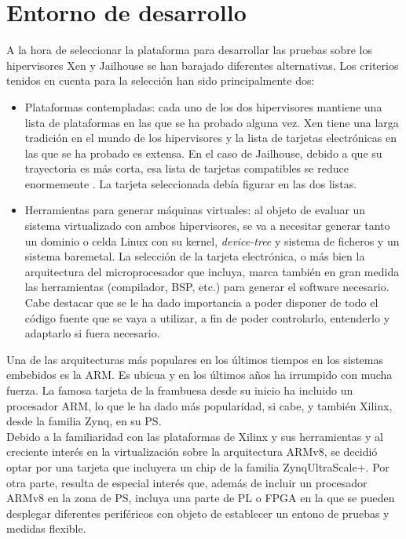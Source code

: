 \chapter{Entorno de desarrollo}

A la hora de seleccionar la plataforma para desarrollar las pruebas sobre los hipervisores Xen y Jailhouse se han barajado diferentes alternativas. Los criterios tenidos en cuenta para la selección han sido principalmente dos:
\begin{itemize}
  \item Plataformas contempladas: cada uno de los dos hipervisores mantiene una lista de plataformas en las que se ha probado alguna vez. Xen tiene una larga tradición en el mundo de los hipervisores y la lista de tarjetas electrónicas en las que se ha probado es extensa. En el caso de Jailhouse, debido a que su trayectoria es más corta, esa lista de tarjetas compatibles se reduce enormemente \cite{jailhouse_github}. La tarjeta seleccionada debía figurar en las dos listas.
  \item Herramientas para generar máquinas virtuales: al objeto de evaluar un sistema virtualizado con ambos hipervisores, se va a necesitar generar tanto un dominio o celda Linux con su kernel, \textit{device-tree} y sistema de ficheros y un sistema baremetal. La selección de la tarjeta electrónica, o más bien la arquitectura del microprocesador que incluya, marca también en gran medida las herramientas (compilador, BSP, etc.) para generar el software necesario. Cabe destacar que se le ha dado importancia a poder disponer de todo el código fuente que se vaya a utilizar, a fin de poder controlarlo, entenderlo y adaptarlo si fuera necesario.
\end{itemize}

Una de las arquitecturas más populares en los últimos tiempos en los sistemas embebidos es la ARM. Es ubicua y en los últimos años ha irrumpido con mucha fuerza. La famosa tarjeta de la frambuesa desde su inicio ha incluido un procesador ARM, lo que le ha dado más popularidad, si cabe, y también Xilinx, desde la familia Zynq, en su PS.\\
Debido a la familiaridad con las plataformas de Xilinx y sus herramientas y al creciente interés en la virtualización sobre la arquitectura ARMv8, se decidió optar por una tarjeta que incluyera un chip de la familia Zynq\textregistered UltraScale+\texttrademark. Por otra parte, resulta de especial interés que, además de incluir un procesador ARMv8 en la zona de PS, incluya una parte de PL o FPGA en la que se pueden desplegar diferentes periféricos con objeto de establecer un entono de pruebas y medidas flexible.

